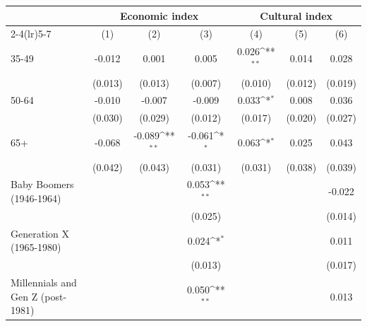 {
\def\sym#1{\ifmmode^{#1}\else\(^{#1}\)\fi}
\begin{tabular}{l*{6}{c}}
\toprule
                    &\multicolumn{3}{c}{Economic index}                               &\multicolumn{3}{c}{Cultural index}                               \\\cmidrule(lr){2-4}\cmidrule(lr){5-7}
                    &\multicolumn{1}{c}{(1)}         &\multicolumn{1}{c}{(2)}         &\multicolumn{1}{c}{(3)}         &\multicolumn{1}{c}{(4)}         &\multicolumn{1}{c}{(5)}         &\multicolumn{1}{c}{(6)}         \\
\midrule
35-49               &      -0.012         &       0.001         &       0.005         &       0.026\sym{**} &       0.014         &       0.028         \\
                    &     (0.013)         &     (0.013)         &     (0.007)         &     (0.010)         &     (0.012)         &     (0.019)         \\
50-64               &      -0.010         &      -0.007         &      -0.009         &       0.033\sym{*}  &       0.008         &       0.036         \\
                    &     (0.030)         &     (0.029)         &     (0.012)         &     (0.017)         &     (0.020)         &     (0.027)         \\
65+                 &      -0.068         &      -0.089\sym{**} &      -0.061\sym{*}  &       0.063\sym{*}  &       0.025         &       0.043         \\
                    &     (0.042)         &     (0.043)         &     (0.031)         &     (0.031)         &     (0.038)         &     (0.039)         \\
Baby Boomers (1946-1964)&                     &                     &       0.053\sym{**} &                     &                     &      -0.022         \\
                    &                     &                     &     (0.025)         &                     &                     &     (0.014)         \\
Generation X (1965-1980)&                     &                     &       0.024\sym{*}  &                     &                     &       0.011         \\
                    &                     &                     &     (0.013)         &                     &                     &     (0.017)         \\
Millennials and Gen Z (post-1981)&                     &                     &       0.050\sym{**} &                     &                     &       0.013         \\

\end{tabular}}
